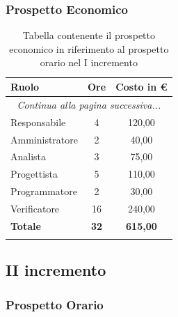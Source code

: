 \documentclass[../piano_di_progetto.tex]{subfiles}
\begin{document}
\subsubsection{Prospetto Economico}

\begin{center}
	\begin{longtable}{|l|c|c|}
		\hline
		\rowcolor{lightgray}
		\textbf{Ruolo} & \textbf{Ore} & \textbf{Costo in €}\\
		\hline
		\endhead
		
		\hline
		\multicolumn{3}{|c|}{\emph{Continua alla pagina successiva...}}\\
		\hline
		\endfoot

		\endlastfoot

		\hline
		Responsabile & 4 & 120,00\\
		Amministratore & 2 & 40,00\\
		Analista & 3 & 75,00\\
		Progettista & 5 & 110,00\\
		Programmatore & 2 & 30,00\\
		Verificatore & 16 & 240,00\\
		\hline
		\textbf{Totale} & \textbf{32} & \textbf{615,00}\\
		\hline
		\rowcolor{white}
		\caption{Tabella contenente il prospetto economico in riferimento al prospetto orario nel I incremento}
	\end{longtable}
\end{center}

\break
\subsection{II incremento}%
\label{sub:incremento_1}
\subsubsection{Prospetto Orario}
\end{document}

